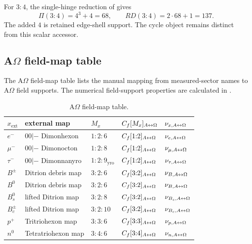 For \(3{:}4\), the single-hinge reduction of
 gives
\begin{equation}
\Pi(3{:}4)=4^3+4=68,
\qquad
RD(3{:}4)=2\cdot68+1=137.
\label{app:rd:eq:three-four-rd}
\end{equation}
The added \(4\) is retained edge-shell support. The cycle object remains
distinct from this scalar accessor.

\subsection{A\texorpdfstring{$\Omega$}{Omega} field-map table}\label{manual:rest:ao-field-value-table}
The A\(\Omega\) field-map table lists the manual mapping from measured-sector names to A\(\Omega\) field supports. The numerical field-support properties are calculated in
.

\begin{table}[H]
\centering
\scriptsize
\caption{A\(\Omega\) field-map table.}
\begin{tabularx}{\textwidth}{l l l l l}
\toprule
\(x_{\mathrm{ext}}\) & external map & \(M_x\) & \(C_f[M_x]_{A{\leftrightarrow}\Omega}\) & \(\nu_{x,A{\leftrightarrow}\Omega}\)\\
\midrule
\(e^-\) & \(00|-\) Dimonhexon & \(1{:}2{:}6\) & \(C_f[1{:}2]_{A{\leftrightarrow}\Omega}\) & \(\nu_{e,A{\leftrightarrow}\Omega}\)\\
\(\mu^-\) & \(00|-\) Dimonocton & \(1{:}2{:}8\) & \(C_f[1{:}2]_{A{\leftrightarrow}\Omega}\) & \(\nu_{\mu,A{\leftrightarrow}\Omega}\)\\
\(\tau^-\) & \(00|-\) Dimonnanyro & \(1{:}2{:}9_{\mathrm{yro}}\) & \(C_f[1{:}2]_{A{\leftrightarrow}\Omega}\) & \(\nu_{\tau,A{\leftrightarrow}\Omega}\)\\
\(B^\pm\) & Ditrion debris map & \(3{:}2{:}6\) & \(C_f[3{:}2]_{A{\leftrightarrow}\Omega}\) & \(\nu_{B,A{\leftrightarrow}\Omega}\)\\
\(B^0\) & Ditrion debris map & \(3{:}2{:}6\) & \(C_f[3{:}2]_{A{\leftrightarrow}\Omega}\) & \(\nu_{B,A{\leftrightarrow}\Omega}\)\\
\(B_s^0\) & lifted Ditrion map & \(3{:}2{:}8\) & \(C_f[3{:}2]_{A{\leftrightarrow}\Omega}\) & \(\nu_{B_s,A{\leftrightarrow}\Omega}\)\\
\(B_c^\pm\) & lifted Ditrion map & \(3{:}2{:}10\) & \(C_f[3{:}2]_{A{\leftrightarrow}\Omega}\) & \(\nu_{B_c,A{\leftrightarrow}\Omega}\)\\
\(p^+\) & Tritriohexon map & \(3{:}3{:}6\) & \(C_f[3{:}3]_{A{\leftrightarrow}\Omega}\) & \(\nu_{p,A{\leftrightarrow}\Omega}\)\\
\(n^0\) & Tetratriohexon map & \(3{:}4{:}6\) & \(C_f[3{:}4]_{A{\leftrightarrow}\Omega}\) & \(\nu_{n,A{\leftrightarrow}\Omega}\)\\
\bottomrule
\end{tabularx}
\label{tab:manual-ao-field-value-table}



\end{table}

